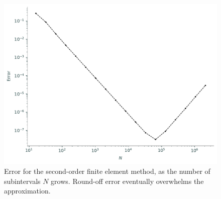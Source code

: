 \begin{figure}[ht]
\centering
\includegraphics[width=\textwidth]{figures/FEM_error_2nd_order.pdf}
\caption{Error for the second-order finite element method, as the number of subintervals $N$ grows.
Round-off error eventually overwhelms the approximation.}
\label{fig:FEM_error_2nd_order}
\end{figure}
